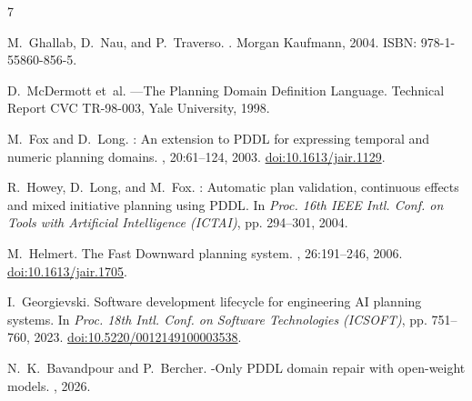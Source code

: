 \documentclass[10pt,a4paper]{article}
\begin{document}
\vspace{-0.4em}
\renewcommand{\refname}{\normalsize Verified References}
\begin{thebibliography}{7}
\footnotesize
\setlength{\itemsep}{0.1ex}

M.~Ghallab, D.~Nau, and P.~Traverso.
.
\newblock Morgan Kaufmann, 2004. ISBN: 978-1-55860-856-5.

D.~McDermott et~al.
---{T}he {P}lanning {D}omain {D}efinition {L}anguage.
\newblock Technical Report CVC TR-98-003, Yale University, 1998.

M.~Fox and D.~Long.
: An extension to {PDDL} for expressing temporal and numeric planning domains.
, 20:61--124, 2003. \href{https://doi.org/10.1613/jair.1129}{doi:10.1613/jair.1129}.

R.~Howey, D.~Long, and M.~Fox.
: Automatic plan validation, continuous effects and mixed initiative planning using {PDDL}.
\newblock In {\em Proc. 16th IEEE Intl. Conf. on Tools with Artificial Intelligence (ICTAI)}, pp. 294--301, 2004.

M.~Helmert.
\newblock The {F}ast {D}ownward planning system.
, 26:191--246, 2006. \href{https://doi.org/10.1613/jair.1705}{doi:10.1613/jair.1705}.

I.~Georgievski.
\newblock Software development lifecycle for engineering {AI} planning systems.
\newblock In {\em Proc. 18th Intl. Conf. on Software Technologies (ICSOFT)}, pp. 751--760, 2023. \href{https://doi.org/10.5220/0012149100003538}{doi:10.5220/0012149100003538}.

N.~K.~Bavandpour and P.~Bercher.
-Only {PDDL} domain repair with open-weight models.
, 2026.

\end{thebibliography}
\end{document}

